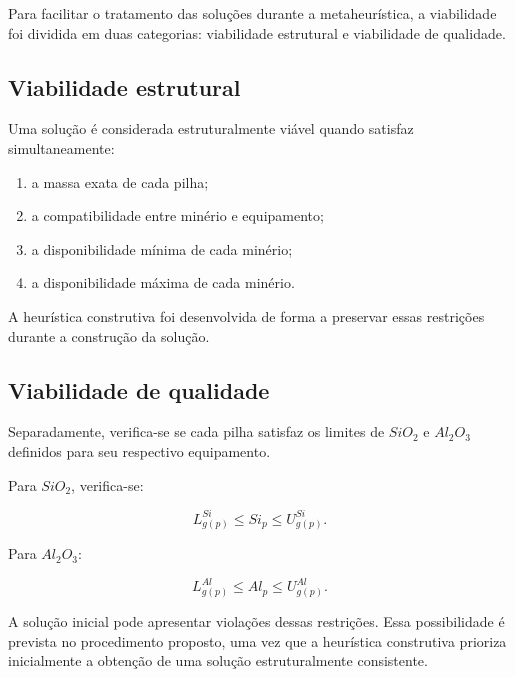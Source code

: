 \documentclass[12pt,a4paper]{article}
\begin{document}
Para facilitar o tratamento das soluções durante a metaheurística,
a viabilidade foi dividida em duas categorias: viabilidade estrutural
e viabilidade de qualidade.


\subsection{Viabilidade estrutural}

Uma solução é considerada estruturalmente viável quando satisfaz
simultaneamente:

\begin{enumerate}

    \item a massa exata de cada pilha;

    \item a compatibilidade entre minério e equipamento;

    \item a disponibilidade mínima de cada minério;

    \item a disponibilidade máxima de cada minério.

\end{enumerate}

A heurística construtiva foi desenvolvida de forma a preservar essas
restrições durante a construção da solução.


\subsection{Viabilidade de qualidade}

Separadamente, verifica-se se cada pilha satisfaz os limites de $SiO_2$
e $Al_2O_3$ definidos para seu respectivo equipamento.

Para $SiO_2$, verifica-se:

\begin{equation}
L_{g(p)}^{Si}
\leq
Si_p
\leq
U_{g(p)}^{Si}.
\end{equation}

Para $Al_2O_3$:

\begin{equation}
L_{g(p)}^{Al}
\leq
Al_p
\leq
U_{g(p)}^{Al}.
\end{equation}

A solução inicial pode apresentar violações dessas restrições. Essa
possibilidade é prevista no procedimento proposto, uma vez que a
heurística construtiva prioriza inicialmente a obtenção de uma solução
estruturalmente consistente.
\end{document}
